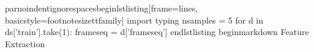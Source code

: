 \markdownRendererDocumentBegin
\markdownRendererBackslash{}par\markdownRendererBackslash{}noindent\markdownRendererBackslash{}ignorespaces\markdownRendererBackslash{}begin\markdownRendererLeftBrace{}lstlisting\markdownRendererRightBrace{}[frame=lines, basicstyle=\markdownRendererBackslash{}footnotesize\markdownRendererBackslash{}ttfamily]\markdownRendererInterblockSeparator
{}\markdownRendererSectionBegin
{}\markdownRendererInterblockSeparator
{}import typing\markdownRendererInterblockSeparator
{}n\markdownRendererUnderscore{}samples = 5\markdownRendererInterblockSeparator
{}
\markdownRendererSectionEnd \markdownRendererSectionBegin
{}\markdownRendererInterblockSeparator
{}for d in ds['train'].take(1): frameseq = d['frameseq']\markdownRendererInterblockSeparator
{}\markdownRendererInterblockSeparator
{}\markdownRendererBackslash{}end\markdownRendererLeftBrace{}lstlisting\markdownRendererRightBrace{} \markdownRendererBackslash{}begin\markdownRendererLeftBrace{}markdown\markdownRendererRightBrace{}\markdownRendererHash{}\markdownRendererHash{} Feature Extraction
\markdownRendererSectionEnd \markdownRendererDocumentEnd